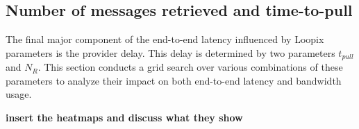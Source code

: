 \documentclass[a4paper,11pt,oneside]{report}
\begin{document}

\subsection{Number of messages retrieved and time-to-pull }

The final major component of the end-to-end latency influenced by Loopix parameters is the provider delay. This delay is determined by two parameters \(t_{pull}\) and \(N_R\). This section conducts a grid search over various combinations of these parameters to analyze their impact on both end-to-end latency and bandwidth usage.

\textbf{insert the heatmaps and discuss what they show}


\end{document}
